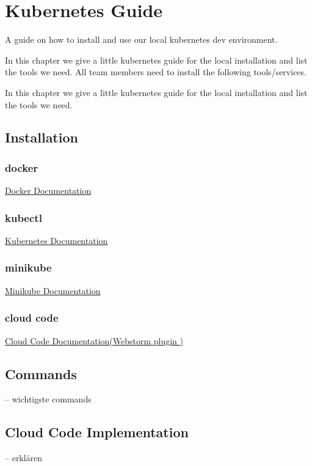 \chapter{Kubernetes Guide}
A guide on how to install and use our local kubernetes dev environment.

In this chapter we give a little kubernetes guide for the local installation and list the tools we need. All team members need to install the following tools/services.

In this chapter we give a little kubernetes guide for the local installation and list the tools we need.
\section{Installation}
\subsection{docker}
\href{https://docs.docker.com/get-docker/}{Docker Documentation}

\subsection{kubectl}
\href{https://kubernetes.io/docs/tasks/tools/#kubectl}{Kubernetes Documentation}

\subsection{minikube}
\href{https://minikube.sigs.k8s.io/docs/start/}{Minikube Documentation}

\subsection{cloud code}
\href{https://plugins.jetbrains.com/plugin/8079-cloud-code/}{Cloud Code Documentation(Webstorm plugin
)}

\section{Commands}
-- wichtigste commands

\section{Cloud Code Implementation}
-- erklären